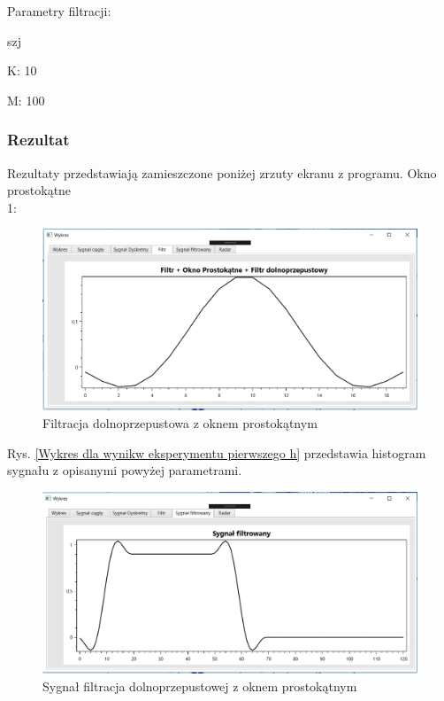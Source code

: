 \documentclass[12pt]{article}
\begin{document}
Parametry filtracji:

\begin{labeling}{szj}
\item [K:] 10
\item [M:] 100 
\end{labeling}

\subsubsection{Rezultat}

Rezultaty przedstawiają zamieszczone poniżej zrzuty ekranu z programu. 
\newpage
Okno prostokątne
\\1:
\begin{figure}[h!]
 \centering
 \includegraphics[width=12.3cm]{prostFDOP.PNG}
 \vspace{-0.3cm}
 \caption{Filtracja dolnoprzepustowa z oknem prostokątnym}
 \label{Wykres dla wyników eksperymentu drugiego}
\end{figure}
\newpage
Rys. \ref{Wykres dla wynikw eksperymentu pierwszego h} przedstawia histogram sygnału z opisanymi powyżej parametrami. 
\begin{figure}[h!]
 \centering
 \includegraphics[width=12.3cm]{prostSFDP.PNG}
 \vspace{-0.3cm}
 \caption{Sygnał filtracja dolnoprzepustowej z oknem prostokątnym}
 \label{Histogram dla wyników eksperymentu drugiego}
\end{figure}
\end{document}
